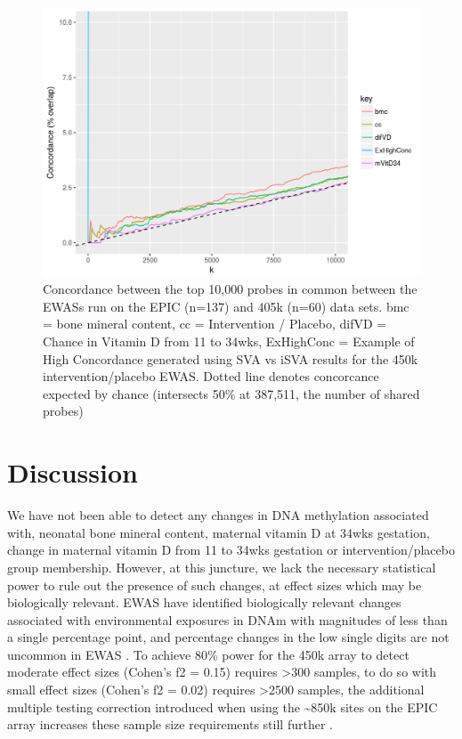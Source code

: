\documentclass[]{book}
\begin{document}
\begin{figure}

{\centering \includegraphics[width=0.8\linewidth]{figs/EPIC450kEWASconcordMAVIDOSMonApr162018zoom} 

}

\caption{Concordance between the top 10,000 probes in common between the EWASs run on the EPIC (n=137) and 405k (n=60) data sets. bmc = bone mineral content, cc = Intervention / Placebo, difVD = Chance in Vitamin D from 11 to 34wks, ExHighConc = Example of High Concordance generated using SVA vs iSVA results for the 450k intervention/placebo EWAS. Dotted line denotes concorcance expected by chance (intersects 50\% at 387,511, the number of shared probes)}\label{fig:EPIC450kEWASconcordMAVIDOSMonApr162018zoom}
\end{figure}



\hypertarget{discussion-1}{%
\section{Discussion}\label{discussion-1}}

We have not been able to detect any changes in DNA methylation associated with, neonatal bone mineral content, maternal vitamin D at 34wks gestation, change in maternal vitamin D from 11 to 34wks gestation or intervention/placebo group membership. However, at this juncture, we lack the necessary statistical power to rule out the presence of such changes, at effect sizes which may be biologically relevant. EWAS have identified biologically relevant changes associated with environmental exposures in DNAm with magnitudes of less than a single percentage point, and percentage changes in the low single digits are not uncommon in EWAS \citep{Breton2017}. To achieve 80\% power for the 450k array to detect moderate effect sizes (Cohen's f2 = 0.15) requires \textgreater300 samples, to do so with small effect sizes (Cohen's f2 = 0.02) requires \textgreater2500 samples, the additional multiple testing correction introduced when using the \textasciitilde850k sites on the EPIC array increases these sample size requirements still further \citep{Cohen1988}.
\end{document}
